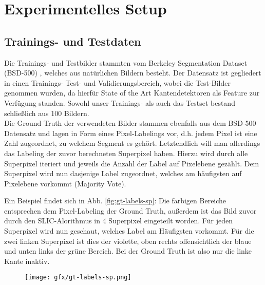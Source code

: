 \chapter{Experimentelles Setup}\label{ch:mathtest} %

\section{Trainings- und Testdaten}


Die Trainings- und Testbilder stammten vom Berkeley Segmentation Dataset (BSD-500) \cite{BSD}, welches aus natürlichen Bildern besteht. Der Datensatz ist gegliedert in einen Trainings- Test- und Validierungsbereich, wobei die Test-Bilder genommen wurden, da hierfür State of the Art Kantendetektoren als Feature zur Verfügung standen. Sowohl unser Trainings- als auch das Testset bestand schließlich aus 100 Bildern. \\

Die Ground Truth der verwendeten Bilder stammen ebenfalls aus dem BSD-500 Datensatz und lagen in Form eines Pixel-Labelings vor, d.h. jedem Pixel ist eine Zahl zugeordnet, zu welchem Segment es gehört. Letztendlich will man allerdings das Labeling der zuvor berechneten Superpixel haben. Hierzu wird durch alle Superpixel iteriert und jeweils die Anzahl der Label auf Pixelebene gezählt. Dem Superpixel wird nun dasjenige Label zugeordnet, welches am häufigsten auf Pixelebene vorkommt (Majority Vote). 

Ein Beispiel findet sich in Abb. \ref{fig:gt-labels-sp}: Die farbigen Bereiche entsprechen dem Pixel-Labeling der Ground Truth, außerdem ist das Bild zuvor durch den SLIC-Alorithmus in 4 Superpixel eingeteilt worden. Für jeden Superpixel wird nun geschaut, welches Label am Häufigsten vorkommt. Für die zwei linken Superpixel ist dies der violette, oben rechts offensichtlich der blaue und unten links der grüne Bereich. Bei der Ground Truth ist also nur die linke Kante inaktiv. 

\vspace{1cm}

\begin{figure}[H]
	\centering
	\texttt{[image: gfx/gt-labels-sp.png]}
\end{figure}
\label{fig:gt-labels-sp}
\vspace{1cm}

